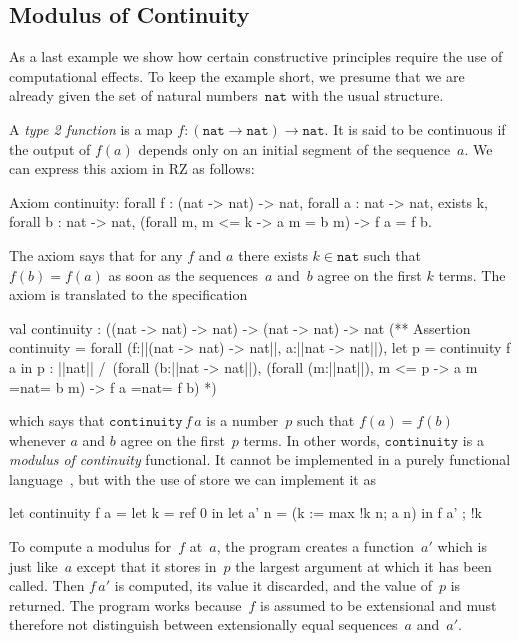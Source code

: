 \subsection{Modulus of Continuity}
\label{sec:we-show-modulus-of-continuity-example}

As a last example we show how certain constructive principles require
the use of computational effects. To keep the example short, we
presume that we are already given the set of natural
numbers~$\mathtt{nat}$ with the usual structure.

A \emph{type 2 function} is a map $f : (\mathtt{nat} \to \mathtt{nat})
\to \mathtt{nat}$. It is said to be continuous if the output of $f(a)$
depends only on an initial segment of the sequence~$a$. We can express
this axiom in RZ as follows:
%
\begin{source}
Axiom continuity:
forall f : (nat -> nat) -> nat, forall a : nat -> nat,
  exists k, forall b : nat -> nat,
    (forall m, m <= k -> a m = b m) -> f a = f b.
\end{source}
%
The axiom says that for any $f$ and $a$ there exists $k \in
\mathtt{nat}$ such that $f(b) = f(a)$ as soon as the sequences~$a$
and~$b$ agree on the first $k$ terms. The axiom is translated to the
specification
%
\begin{source}
val continuity : ((nat -> nat) -> nat) -> (nat -> nat) -> nat
(**  Assertion continuity =
forall (f:||(nat -> nat) -> nat||, a:||nat -> nat||),
  let p = continuity f a in p : ||nat|| /\
  (forall (b:||nat -> nat||),
     (forall (m:||nat||),  m <= p -> a m =nat= b m) -> f a =nat= f b)
*)
\end{source}
%
which says that $\mathtt{continuity}\,f\,a$ is a number~$p$ such that
$f(a) = f(b)$ whenever $a$ and $b$ agree on the first~$p$ terms. In
other words, $\mathtt{continuity}$ is a \emph{modulus of continuity}
functional. It cannot be implemented in a purely functional
language~\cite{modulus-violates-ac2}, but with the use of store we can
implement it as
%
\begin{source}
let continuity f a =
  let k = ref 0 in
  let a' n = (k := max !k n; a n) in
    f a' ; !k
\end{source}
%
To compute a modulus for~$f$ at~$a$, the program creates a
function~$a'$ which is just like~$a$ except that it stores in~$p$ the
largest argument at which it has been called. Then $f\,a'$ is
computed, its value it discarded, and the value of~$p$ is returned.
The program works because~$f$ is assumed to be extensional and must
therefore not distinguish between extensionally equal sequences~$a$
and~$a'$.



